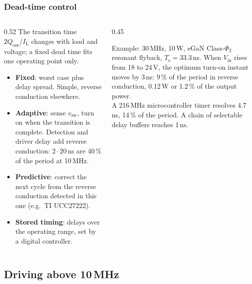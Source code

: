 \begin{frame}
	\frametitle{Dead-time control}
	\begin{columns}[T]
		\begin{column}{0.52\textwidth}
			\small
			The transition time $2Q_\mathrm{oss}/I_\mathrm{L}$ changes with load and voltage; a fixed dead time fits one operating point only.
			\begin{itemize}
				\item \textbf{Fixed}: worst case plus delay spread. Simple, reverse conduction elsewhere.
				\item \textbf{Adaptive}: sense $v_\mathrm{sw}$, turn on when the transition is complete. Detection and driver delay add reverse conduction: $2\cdot20$\,ns are 40\,\% of the period at 10\,MHz.
				\item \textbf{Predictive}: correct the next cycle from the reverse conduction detected in this one (e.g.\ TI UCC27222).
				\item \textbf{Stored timing}: delays over the operating range, set by a digital controller.
			\end{itemize}
		\end{column}
		\begin{column}{0.45\textwidth}
			\begin{block}{Example: 30\,MHz, 10\,W, eGaN}
				\small
				Class-$\Phi_2$ resonant flyback, $T_\mathrm{s}=33.3$\,ns. When $V_\mathrm{in}$ rises from 18 to 24\,V, the optimum turn-on instant moves by 3\,ns: 9\,\% of the period in reverse conduction, 0.12\,W or 1.2\,\% of the output power.\\[0.4em]
				A 216\,MHz microcontroller timer resolves 4.7\,ns, 14\,\% of the period. A chain of selectable delay buffers reaches 1\,ns.
			\end{block}
		\end{column}
	\end{columns}
\end{frame}

\subsection{Driving above 10\,MHz}

